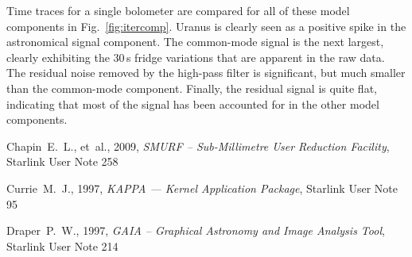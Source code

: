 \documentclass[twoside,11pt]{article}
\newcommand{\xref}[3]{#1}
\renewcommand{\_}{\texttt{\symbol{95}}}
\begin{document}
Time traces for a single bolometer are compared for all of these model
components in Fig.~\ref{fig:itercomp}. Uranus is clearly seen as a
positive spike in the astronomical signal component. The common-mode
signal is the next largest, clearly exhibiting the 30\,s fridge
variations that are apparent in the raw data. The residual noise
removed by the high-pass filter is significant, but much smaller than
the common-mode component. Finally, the residual signal is quite flat,
indicating that most of the signal has been accounted for in the other
model components.

\begin{thebibliography}{}

Chapin~E.~L., et~al., 2009, \textit{SMURF -- Sub-Millimetre User Reduction
Facility},
\xref{Starlink User Note 258}{sun258}{}

Currie~M.~J., 1997, {\it KAPPA --- Kernel Application Package},
\xref{Starlink User Note 95}{sun95}{}

Draper~P.~W., 1997, {\it GAIA -- Graphical Astronomy and Image
Analysis Tool},
\xref{Starlink User Note 214}{sun214}{}

\end{thebibliography}
\end{document}
